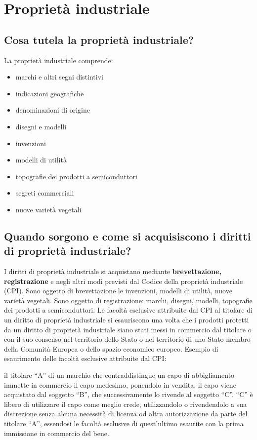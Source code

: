 \newpage
\section{Proprietà industriale}

\subsection{Cosa tutela la proprietà industriale?}
La proprietà industriale comprende:
\begin{itemize}
    \item marchi e altri segni distintivi
    \item indicazioni geografiche
    \item denominazioni di origine
    \item disegni e modelli
    \item invenzioni
    \item modelli di utilità
    \item topografie dei prodotti a semiconduttori
    \item segreti commerciali
    \item nuove varietà vegetali
\end{itemize}

\subsection{Quando sorgono e come si acquisiscono i diritti di proprietà industriale?}
I diritti di proprietà industriale si acquistano mediante \textbf{brevettazione, registrazione} e negli altri
modi previsti dal Codice della proprietà industriale (CPI). \newline
Sono oggetto di brevettazione le invenzioni, modelli di utilità, nuove varietà vegetali. \newline
Sono oggetto di registrazione: marchi, disegni, modelli, topografie dei prodotti a semiconduttori.\newline
Le facoltà esclusive attribuite dal CPI al titolare di un diritto di proprietà industriale si esauriscono una volta
che i prodotti protetti da un diritto di proprietà industriale siano stati messi in commercio dal titolare o con
il suo consenso nel territorio dello Stato o nel territorio di uno Stato membro della Comunità Europea o dello spazio
economico europeo. Esempio di esaurimento delle facoltà esclusive attribuite dal CPI: \newline

il titolare “A” di un marchio che contraddistingue un capo di abbigliamento immette in commercio il capo medesimo, ponendolo in vendita; il capo viene acquistato dal soggetto “B”, che successivamente lo rivende al soggetto “C”. “C” è libero di utilizzare il capo come meglio crede, utilizzandolo o rivendendolo a sua discrezione senza alcuna necessità di licenza od altra autorizzazione da parte del titolare “A”, essendosi le facoltà esclusive di quest'ultimo esaurite con la prima immissione in commercio del bene.

